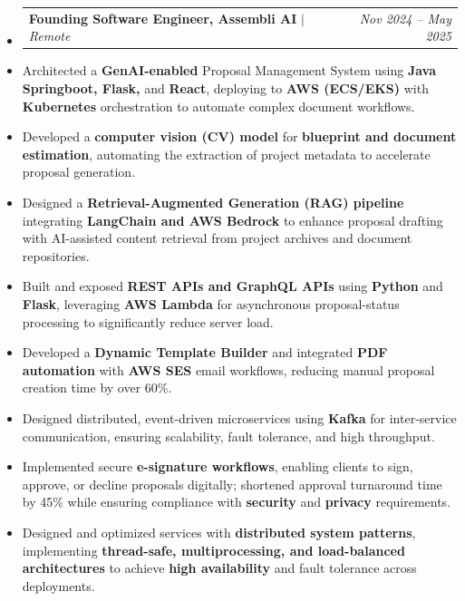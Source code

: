 \documentclass[a4paper,10pt]{article}
\makeatletter
\newcommand{\resumeSubheading}[4]{
  \vspace{-1pt}\item
    \begin{tabular*}{\linewidth}{l@{\extracolsep{\fill}}r}
      \textbf{#1} $|$ \textit{#2} & \textit{#4} \\
    \end{tabular*}\vspace{-4pt}
}
\newcommand{\textbulletlight}{\raisebox{0.15ex}{\scalebox{0.6}{$\bullet$}}}
\makeatother
\begin{document}
\vspace{-2pt}
\begin{itemize}[leftmargin=0pt, rightmargin=0pt, label={}, itemsep=0pt]
    \resumeSubheading{Founding Software Engineer, Assembli AI}{Remote}
    {}{Nov 2024 -- May 2025}
\end{itemize}\vspace{-6pt}
\begin{itemize}[leftmargin=12pt, rightmargin=0pt, label={\textbulletlight}, itemsep=0pt, topsep=2pt]
        \item \small Architected a \textbf{GenAI-enabled} Proposal Management System using \textbf{Java Springboot, Flask,} and \textbf{React}, deploying to \textbf{AWS (ECS/EKS)} with \textbf{Kubernetes} orchestration to automate complex document workflows.
        \item Developed a \textbf{computer vision (CV) model} for \textbf{blueprint and document estimation}, automating the extraction of project metadata to accelerate proposal generation.
        \item Designed a \textbf{Retrieval-Augmented Generation (RAG) pipeline} integrating \textbf{LangChain and AWS Bedrock} to enhance proposal drafting with AI-assisted content retrieval from project archives and document repositories.
        \item Built and exposed \textbf{REST APIs and GraphQL APIs} using \textbf{Python} and \textbf{Flask}, leveraging \textbf{AWS Lambda} for asynchronous proposal-status processing to significantly reduce server load.
        \item Developed a \textbf{Dynamic Template Builder} and integrated \textbf{PDF automation} with \textbf{AWS SES} email workflows, reducing manual proposal creation time by over 60\%.
        \item Designed distributed, event-driven microservices using \textbf{Kafka} for inter-service communication, ensuring scalability, fault tolerance, and high throughput.
        \item Implemented secure \textbf{e-signature workflows}, enabling clients to sign, approve, or decline proposals digitally; shortened approval turnaround time by 45\% while ensuring compliance with \textbf{security} and \textbf{privacy} requirements.
        \item Designed and optimized services with \textbf{distributed system patterns}, implementing \textbf{thread-safe, multiprocessing, and load-balanced architectures} to achieve \textbf{high availability} and fault tolerance across deployments.

\end{itemize}
\end{document}
